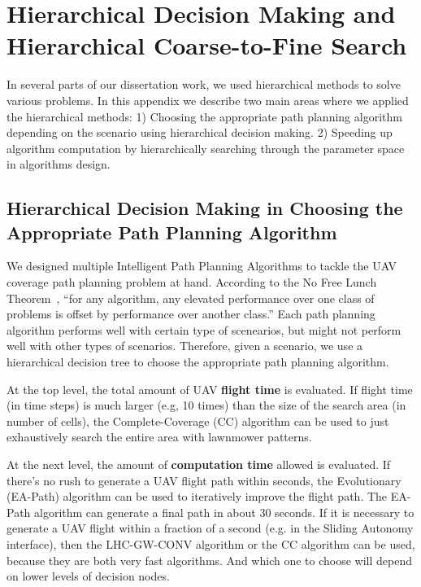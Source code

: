 \chapter{Hierarchical Decision Making and Hierarchical Coarse-to-Fine Search}
\label{chap:hierarchical}

In several parts of our dissertation work, we used hierarchical methods to solve various problems. In this appendix we describe two main areas where we applied the hierarchical methods: 1) Choosing the appropriate path planning algorithm depending on the scenario using hierarchical decision making. 2) Speeding up algorithm computation by hierarchically searching through the parameter space in algorithms design.

\section{Hierarchical Decision Making in Choosing the Appropriate Path Planning Algorithm}
\label{Decision}

We designed multiple Intelligent Path Planning Algorithms to tackle the UAV coverage path planning problem at hand. According to the No Free Lunch Theorem~\cite{Wolpert1997No}, ``for any algorithm, any elevated performance over one class of problems is offset by performance over another class.'' Each path planning algorithm performs well with certain type of scenearios, but might not perform well with other types of scenarios. Therefore, given a scenario, we use a hierarchical decision tree to choose the appropriate path planning algorithm.

At the top level, the total amount of UAV \textbf{flight time} is evaluated. If flight time (in time steps) is much larger (e.g, 10 times) than the size of the search area (in number of cells), the Complete-Coverage (CC) algorithm can be used to just exhaustively search the entire area with lawnmower patterns.

At the next level, the amount of \textbf{computation time} allowed is evaluated. If there's no rush to generate a UAV flight path within seconds, the Evolutionary (EA-Path) algorithm can be used to iteratively improve the flight path. The EA-Path algorithm can generate a final path in about 30 seconds. If it is necessary to generate a UAV flight within a fraction of a second (e.g. in the Sliding Autonomy interface), then the LHC-GW-CONV algorithm or the CC algorithm can be used, because they are both very fast algorithms. And which one to choose will depend on lower levels of decision nodes.

